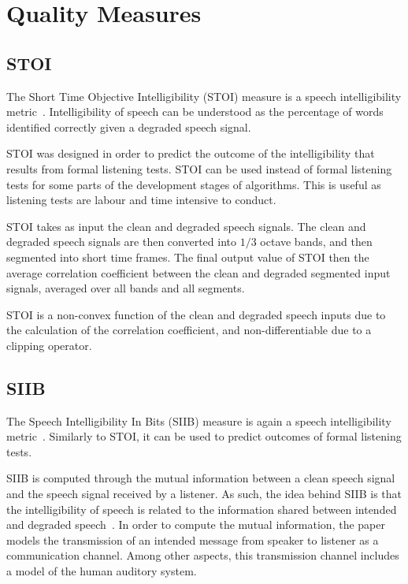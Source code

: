 \section{Quality Measures}
\subsection{STOI}
The Short Time Objective Intelligibility (STOI) measure is a speech intelligibility metric~\cite{taal2011algorithm}.
Intelligibility of speech can be understood as the percentage of words identified correctly given 
a degraded speech signal.

STOI was designed in order to predict the outcome of the intelligibility that results from formal listening tests.
STOI can be used instead of formal listening tests for some parts of the development stages of algorithms. 
This is useful as listening tests are labour and time intensive to conduct.

STOI takes as input the clean and degraded speech signals.
The clean and degraded speech signals are then converted into $1/3$ octave bands, and then segmented into short time frames.
The final output value of STOI then the average correlation coefficient between the clean and degraded segmented input signals,
averaged over all bands and all segments.

STOI is a non-convex function of the clean and degraded speech inputs due to the calculation of the correlation coefficient,
and non-differentiable due to a clipping operator. 

\subsection{SIIB}
The Speech Intelligibility In Bits (SIIB) measure is again a speech intelligibility metric~\cite{van2017instrumental}. 
Similarly to STOI, it can be used to predict outcomes of formal listening tests.

SIIB is computed through the mutual information between a clean speech signal and the speech signal received by a listener.
As such, the idea behind SIIB is that the intelligibility of speech is related to the information shared between intended and 
degraded speech~\cite{van2017instrumental}.
In order to compute the mutual information, the paper models the transmission of an intended message from speaker to listener as a communication channel.
Among other aspects, this transmission channel includes a model of the human auditory system.

